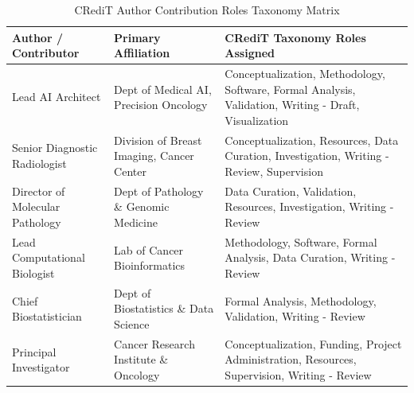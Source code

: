 \begin{table}[t]
\centering
\caption{CRediT Author Contribution Roles Taxonomy Matrix}
\label{tab:Table_6_04_03_CRediT_Author_Contribution_Matrix}
\begin{tabular}{lll}
\toprule
\textbf{Author / Contributor} & \textbf{Primary Affiliation} & \textbf{CRediT Taxonomy Roles Assigned} \\
\midrule
Lead AI Architect & Dept of Medical AI, Precision Oncology & Conceptualization, Methodology, Software, Formal Analysis, Validation, Writing - Draft, Visualization \\
Senior Diagnostic Radiologist & Division of Breast Imaging, Cancer Center & Conceptualization, Resources, Data Curation, Investigation, Writing - Review, Supervision \\
Director of Molecular Pathology & Dept of Pathology \& Genomic Medicine & Data Curation, Validation, Resources, Investigation, Writing - Review \\
Lead Computational Biologist & Lab of Cancer Bioinformatics & Methodology, Software, Formal Analysis, Data Curation, Writing - Review \\
Chief Biostatistician & Dept of Biostatistics \& Data Science & Formal Analysis, Methodology, Validation, Writing - Review \\
Principal Investigator & Cancer Research Institute \& Oncology & Conceptualization, Funding, Project Administration, Resources, Supervision, Writing - Review \\
\bottomrule
\end{tabular}
\end{table}
